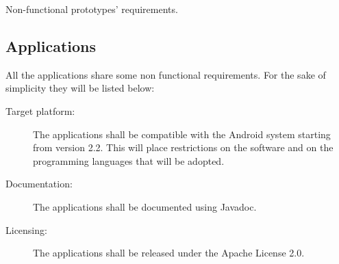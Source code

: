 Non-functional prototypes' requirements.


\subsection{Applications}

All the applications share some non functional requirements.
For the sake of simplicity they will be listed below:

\begin{description}
	\item[Target platform:] The applications shall be compatible with the Android
	system starting from version 2.2. This will place restrictions on the software
	and on the programming languages that will be adopted.
	\item[Documentation:] The applications shall be documented using Javadoc.
	\item[Licensing:] The applications shall be released under the Apache License 2.0.
\end{description}

\newpage
